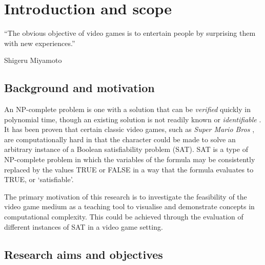 \documentclass[11pt, a4paper, oneside]{report} %
\begin{document}
\chapter{Introduction and scope}


\epigraph{``The obvious objective of video games is to entertain people by surprising them with new
experiences.''}{Shigeru Miyamoto}


\section{Background and motivation}

An NP-complete problem is one with a solution that can be \textit{verified}
quickly in polynomial time, though an existing solution is not readily known or
\textit{identifiable} \cite{cook1984can}. It has been proven that certain
classic video games, such as \textit{Super Mario Bros} \cite{Aloupis2012}, are
computationally hard in that the character could be made to solve an arbitrary
instance of a Boolean satisfiability problem (SAT). SAT is a type of NP-complete
problem in which the variables of the formula may be consistently replaced by
the values TRUE or FALSE in a way that the formula evaluates to TRUE, or
`satisfiable'.

The primary motivation of this research is to investigate the feasibility of the video game medium
as a teaching tool to visualise and demonstrate concepts in computational complexity. This could be
achieved through the evaluation of different instances of SAT in a video game setting.\@ 



\section{Research aims and objectives}

\end{document}
